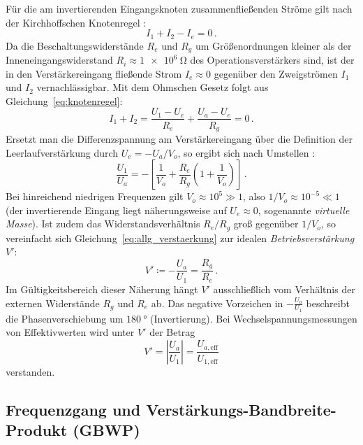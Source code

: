 \documentclass[12pt,a4paper,titlepage]{scrartcl}
\numberwithin{equation}{section}
\numberwithin{table}{section}
\numberwithin{figure}{section}
\begin{document}
Für die am invertierenden Eingangsknoten zusammenfließenden Ströme gilt nach der Kirchhoffschen Knotenregel \cite{PAPskript}:
\begin{equation}
    I_1 + I_2 - I_e = 0 \,.
    \label{eq:knotenregel}
\end{equation}
Da die Beschaltungswiderstände $R_e$ und $R_g$ um Größenordnungen kleiner als der Inneneingangswiderstand $R_i \approx \SI{1e6}{\ohm}$ des Operationsverstärkers sind, ist der in den Verstärkereingang fließende Strom $I_e \approx 0$ gegenüber den Zweigströmen $I_1$ und $I_2$ vernachlässigbar. Mit dem Ohmschen Gesetz folgt aus Gleichung~\eqref{eq:knotenregel}:
\begin{equation}
    I_1 + I_2 = \frac{U_1 - U_e}{R_e} + \frac{U_a - U_e}{R_g} = 0 \,.
    \label{eq:strombilanz}
\end{equation}
Ersetzt man die Differenzspannung am Verstärkereingang über die Definition der Leerlaufverstärkung durch $U_e = -U_a / V_o$, so ergibt sich nach Umstellen \cite{PAPskript}:
\begin{equation}
    \frac{U_1}{U_a} = -\left[\frac{1}{V_o} + \frac{R_e}{R_g}\left(1 + \frac{1}{V_o}\right)\right] \,.
    \label{eq:allg_verstaerkung}
\end{equation}
Bei hinreichend niedrigen Frequenzen gilt $V_o \approx 10^5 \gg 1$, also $1/V_o \approx 10^{-5} \ll 1$ (der invertierende Eingang liegt näherungsweise auf $U_e \approx 0$, sogenannte \emph{virtuelle Masse}). Ist zudem das Widerstandsverhältnis $R_e / R_g$ groß gegenüber $1/V_o$, so vereinfacht sich Gleichung~\eqref{eq:allg_verstaerkung} zur idealen \emph{Betriebsverstärkung} $V'$:
\begin{equation}
    V' \coloneqq -\frac{U_a}{U_1} = \frac{R_g}{R_e} \,.
    \label{eq:betriebsverstaerkung}
\end{equation}
Im Gültigkeitsbereich dieser Näherung hängt $V'$ ausschließlich vom Verhältnis der externen Widerstände $R_g$ und $R_e$ ab. Das negative Vorzeichen in $-\frac{U_a}{U_1}$ beschreibt die Phasenverschiebung um $\SI{180}{\degree}$ (Invertierung). Bei Wechselspannungsmessungen von Effektivwerten wird unter $V'$ der Betrag
\begin{equation}
    V' = \left|\frac{U_a}{U_1}\right| = \frac{U_{a,\text{eff}}}{U_{1,\text{eff}}}
    \label{eq:betriebsverstaerkung_ac}
\end{equation}
verstanden.

\subsection{Frequenzgang und Verstärkungs-Bandbreite-Produkt (GBWP)}
\end{document}
